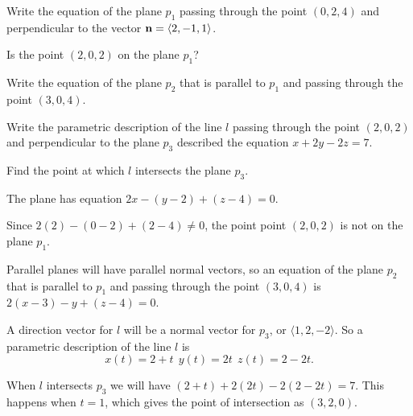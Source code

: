 \begin{activity} \label{A:9.5.9} 
  \ba
\item Write the equation of the plane $p_1$ passing through the point $(0,
  2, 4)$ and perpendicular to the vector $\mathbf{n}=\langle 2, -1,
  1\rangle$.

\item Is the point $(2, 0, 2)$ on the plane $p_1$?

\item Write the equation of the plane $p_2$ that is parallel to $p_1$
  and passing through the point $(3, 0, 4)$.  
	
\item Write the parametric description of the line $l$ passing through the
  point $(2,0,2)$ and perpendicular to the plane $p_3$ described the
  equation $x+2y-2z = 7$.

\item Find the point at which $l$ intersects the plane $p_3$.
	
	
	\ea


\end{activity}
\begin{smallhint}

\end{smallhint}
\begin{bighint}

\end{bighint}
\begin{activitySolution}
\ba
\item The plane has equation $2x-(y-2)+(z-4)=0$. 


\item Since $2(2)-(0-2)+(2-4) \neq 0$, the point point $(2, 0, 2)$ is not on the plane $p_1$.

\item Parallel planes will have parallel normal vectors, so an equation of the plane $p_2$ that is parallel to $p_1$
  and passing through the point $(3, 0, 4)$ is $2(x-3)-y+(z-4)=0$.   
	
\item A direction vector for $l$ will be a normal vector for $p_3$, or $\langle 1,2,-2\rangle$. So a parametric description of the line $l$ is 
\[x(t) = 2+t \ \ y(t) = 2t \ \ z(t) = 2-2t.\]

\item When $l$ intersects $p_3$ we will have $(2+t)+2(2t)-2(2-2t) = 7$. This happens when $t=1$, which gives the point of intersection as $(3,2,0)$. 
\ea
\end{activitySolution}
\aftera
